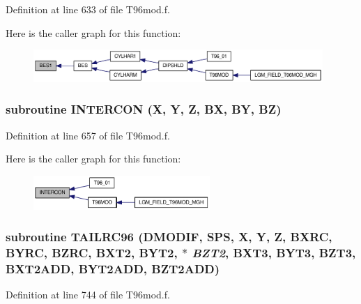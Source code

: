 Definition at line 633 of file T96mod.f.

Here is the caller graph for this function:\nopagebreak
\begin{figure}[H]
\begin{center}
\leavevmode
\includegraphics[width=311pt]{_t96mod_8f_5dd1f9e8738676c1ded360e252f7ef48_icgraph}
\end{center}
\end{figure}
\hypertarget{_t96mod_8f_2e097fa1f961156bc2ca8b94983b9e4f}{
\subsubsection[{INTERCON}]{\setlength{\rightskip}{0pt plus 5cm}subroutine INTERCON (X, \/  Y, \/  Z, \/  BX, \/  BY, \/  BZ)}}
\label{_t96mod_8f_2e097fa1f961156bc2ca8b94983b9e4f}




Definition at line 657 of file T96mod.f.

Here is the caller graph for this function:\nopagebreak
\begin{figure}[H]
\begin{center}
\leavevmode
\includegraphics[width=190pt]{_t96mod_8f_2e097fa1f961156bc2ca8b94983b9e4f_icgraph}
\end{center}
\end{figure}
\hypertarget{_t96mod_8f_a2c7e086277c827ff05f4a9c6eb99b2b}{
\subsubsection[{TAILRC96}]{\setlength{\rightskip}{0pt plus 5cm}subroutine TAILRC96 (DMODIF, \/  SPS, \/  X, \/  Y, \/  Z, \/  BXRC, \/  BYRC, \/  BZRC, \/  BXT2, \/  BYT2, \/  $\ast$ {\em BZT2}, \/  BXT3, \/  BYT3, \/  BZT3, \/  BXT2ADD, \/  BYT2ADD, \/  BZT2ADD)}}
\label{_t96mod_8f_a2c7e086277c827ff05f4a9c6eb99b2b}




Definition at line 744 of file T96mod.f.

